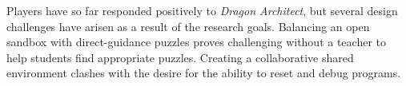 \documentclass{sig-alternate}
\newcommand{\TODO}[1]{{\color{red} TODO: #1}}
\newcommand{\gametitle}{{\emph{Dragon Architect}}}
\begin{document}
Players have so far responded positively to \gametitle{}, but several design challenges have arisen as a result of the research goals.
Balancing an open sandbox with direct-guidance puzzles proves challenging without a teacher to help students find appropriate puzzles.
Creating a collaborative shared environment clashes with the desire for the ability to reset and debug programs.



 
\end{document}
